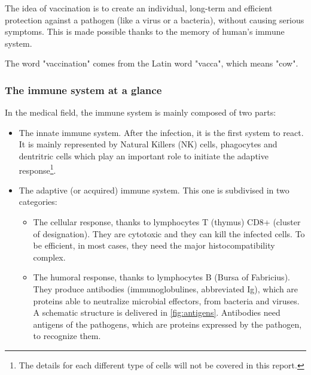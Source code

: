 \documentclass{article}
\begin{document}
            The idea of vaccination is to create an individual, long-term and efficient protection against a pathogen (like a virus or a bacteria), without causing serious symptoms.
            This is made possible thanks to the memory of human's immune system.

            The word "vaccination" comes from the Latin word "vacca", which means "cow".

            \subsubsection*{The immune system at a glance}

                In the medical field, the immune system is mainly composed of two parts:

                \begin{itemize}
                    \item The innate immune system. After the infection, it is the first system to react. It is mainly represented by Natural Killers (NK) cells,
                            phagocytes and dentritric cells which play an important role to initiate the adaptive response\footnote{The details for each different type 
                                of cells will not be covered in this report.}.
                    \item The adaptive (or acquired) immune system. This one is subdivised in two categories: 
                        \begin{itemize}
                            \item The cellular response, thanks to lymphocytes T (thymus) CD8+ (cluster of designation). They are cytotoxic and they can kill the infected cells.
                                    To be efficient, in most cases, they need the major histocompatibility complex.
                            \item The humoral response, thanks to lymphocytes B (Bursa of Fabricius). They produce antibodies (immunoglobulines, abbreviated Ig), which are proteins able to 
                                    neutralize microbial effectors, from bacteria and viruses. 
                                    A schematic structure is delivered in \ref{fig:antigens}.
                                    Antibodies need antigens of the pathogens, which are proteins expressed by the pathogen, to recognize them.
                        \end{itemize}


\end{itemize}
\end{document}

